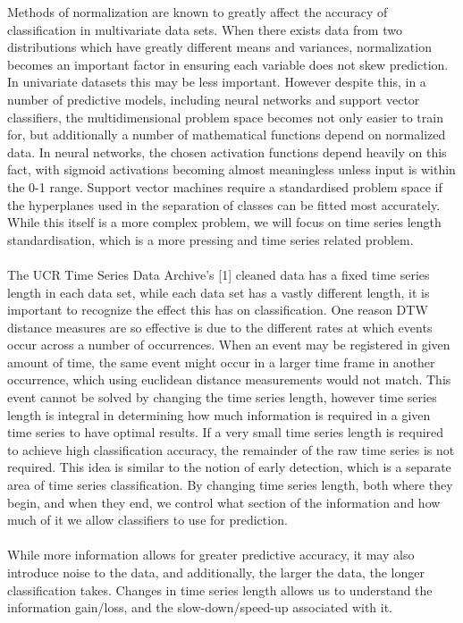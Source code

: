 \documentclass[10pt,a4paper]{article}
\begin{document}
Methods of normalization are known to greatly affect the accuracy of classification in multivariate data sets.
When there exists data from two distributions which have greatly different means and variances, normalization becomes an important factor in ensuring each variable does not skew prediction.
In univariate datasets this may be less important.
However despite this, in a number of predictive models, including neural networks and support vector classifiers, the multidimensional problem space becomes not only easier to train for, but additionally a number of mathematical functions depend on normalized data.
In neural networks, the chosen activation functions depend heavily on this fact, with sigmoid activations becoming almost meaningless unless input is within the 0-1 range.
Support vector machines require a standardised problem space if the hyperplanes used in the separation of classes can be fitted most accurately.
While this itself is a more complex problem, we will focus on time series length standardisation, which is a more pressing and time series related problem.
\\\\
The UCR Time Series Data Archive's [1] cleaned data has a fixed time series length in each data set, while each data set has a vastly different length, it is important to recognize the effect this has on classification.
One reason DTW distance measures are so effective is due to the different rates at which events occur across a number of occurrences.
When an event may be registered in given amount of time, the same event might occur in a larger time frame in another occurrence, which using euclidean distance measurements would not match.
This event cannot be solved by changing the time series length, however time series length is integral in determining how much information is required in a given time series to have optimal results.
If a very small time series length is required to achieve high classification accuracy, the remainder of the raw time series is not required.
This idea is similar to the notion of early detection, which is a separate area of time series classification.
By changing time series length, both where they begin, and when they end, we control what section of the information and how much of it we allow classifiers to use for prediction.
\\\\
While more information allows for greater predictive accuracy, it may also introduce noise to the data, and additionally, the larger the data, the longer classification takes. 
Changes in time series length allows us to understand the information gain/loss, and the slow-down/speed-up associated with it. 
\end{document}

